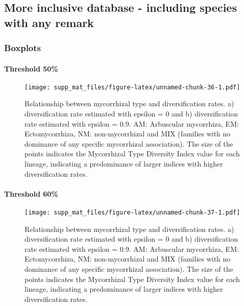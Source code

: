 \documentclass[]{article}
\let\oldparagraph\paragraph
\renewcommand{\paragraph}[1]{\oldparagraph{#1}\mbox{}}
\begin{document}
\pagebreak

\hypertarget{more-inclusive-database---including-species-with-any-remark}{%
\subsection{More inclusive database - including species with any
remark}\label{more-inclusive-database---including-species-with-any-remark}}

\hypertarget{boxplots-3}{%
\subsubsection{Boxplots}\label{boxplots-3}}

\hypertarget{threshold-50-3}{%
\paragraph{Threshold 50\%}\label{threshold-50-3}}

\begin{figure}
\centering
\texttt{[image: supp\_mat\_files/figure-latex/unnamed-chunk-36-1.pdf]}
\caption{Relationship between mycorrhizal type and diversification
rates. a) diversification rate estimated with epsilon = 0 and b)
diversification rate estimated with epsilon = 0.9. AM: Arbuscular
mycorrhiza, EM: Ectomycorrhiza, NM: non-mycorrhizal and MIX (families
with no dominance of any specific mycorrhizal association). The size of
the points indicates the Mycorrhizal Type Diversity Index value for each
lineage, indicating a predominance of larger indices with higher
diversification rates.}
\end{figure}

\pagebreak

\hypertarget{threshold-60-3}{%
\paragraph{Threshold 60\%}\label{threshold-60-3}}

\begin{figure}
\centering
\texttt{[image: supp\_mat\_files/figure-latex/unnamed-chunk-37-1.pdf]}
\caption{Relationship between mycorrhizal type and diversification
rates. a) diversification rate estimated with epsilon = 0 and b)
diversification rate estimated with epsilon = 0.9. AM: Arbuscular
mycorrhiza, EM: Ectomycorrhiza, NM: non-mycorrhizal and MIX (families
with no dominance of any specific mycorrhizal association). The size of
the points indicates the Mycorrhizal Type Diversity Index value for each
lineage, indicating a predominance of larger indices with higher
diversification rates.}
\end{figure}
\end{document}
